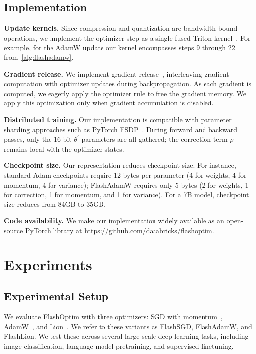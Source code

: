 \documentclass[10pt,twocolumn,letterpaper]{article}
\theoremstyle{plain}
\theoremstyle{definition}
\theoremstyle{remark}
\newcommand{\flashOptim}{FlashOptim\xspace}
\newcommand{\flashAdam}{FlashAdamW\xspace}
\newcommand{\flashSGD}{FlashSGD\xspace}
\newcommand{\flashLion}{FlashLion\xspace}
\newcommand{\thetalp}{\theta^\prime}
\begin{document}
\subsection{Implementation}

\textbf{Update kernels.}
Since compression and quantization are bandwidth-bound operations, we implement the optimizer step as a single fused Triton kernel~\citep{tillet2019triton}. 
For example, for the AdamW update our kernel encompasses steps 9 through 22 from~\autoref{alg:flashadamw}.

\textbf{Gradient release.}
We implement gradient release~\citep{zhang2023adam}, interleaving gradient computation with optimizer updates during backpropagation.
As each gradient is computed, we eagerly apply the optimizer rule to free the gradient memory.
We apply this optimization only when gradient accumulation is disabled. 

\textbf{Distributed training.}
Our implementation is compatible with parameter sharding approaches such as PyTorch FSDP~\citep{zhao2023pytorchfsdp}.
During forward and backward passes, only the 16-bit $\thetalp$ parameters are all-gathered; the correction term $\rho$ remains local with the optimizer states.

\textbf{Checkpoint size.}
Our representation reduces checkpoint size.
For instance, standard Adam checkpoints require 12 bytes per parameter (4 for weights, 4 for momentum, 4 for variance); \flashAdam requires only 5 bytes (2 for weights, 1 for correction, 1 for momentum, and 1 for variance).
For a 7B model, checkpoint size reduces from 84GB to 35GB.

\textbf{Code availability.}
We make our implementation widely available as an open-source PyTorch library at \url{https://github.com/databricks/flashoptim}. 






\section{Experiments} \label{sec:results}

\subsection{Experimental Setup}

We evaluate \flashOptim with three optimizers: SGD with momentum~\citep{polyak1964some}, AdamW~\citep{loshchilov2017decoupled}, and Lion~\citep{chen2023lion}. We refer to these variants as \flashSGD, \flashAdam, and \flashLion. We test these across several large-scale deep learning tasks, including image classification, language model pretraining, and supervised finetuning.
\end{document}
